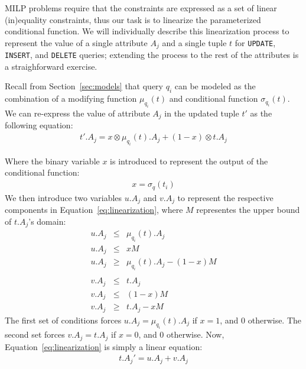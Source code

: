
MILP problems require that the constraints are expressed as a set of linear
(in)equality constraints, thus our task is to linearize the parameterized
conditional function.   We will individually describe this linearization process 
to represent the value of a single attribute $A_j$ and a single tuple $t$ for 
\texttt{UPDATE}, \texttt{INSERT}, and \texttt{DELETE} queries; 
extending the process to the rest of the attributes is a straighforward exercise.



Recall from Section~\ref{sec:models} that query $q_i$ can be modeled as
the combination of a modifying function $\mu_q_i(t)$ and conditional function $\sigma_q_i(t)$.
We can re-express the value of attribute $A_j$ in the updated tuple $t'$ as the following equation:
{\scriptsize
\begin{eqnarray}
\label{eq:linearization}
t'.A_j = x\otimes \mu_q_i(t).A_j + (1-x)\otimes t.A_j 
\end{eqnarray} 
}


\noindent Where the binary variable $x$ is introduced to represent the output of 
the conditional function:
{\scriptsize
\begin{eqnarray}
\label{eq:x}
x = \sigma_q(t_i)
\end{eqnarray}
}
We then introduce two variables $u.A_j$ and $v.A_j$ to represent 
the respective components in Equation~\ref{eq:linearization}, where
$M$ representes the upper bound of $t.A_j$'s domain:
{\scriptsize 
\begin{eqnarray}
\label{eq:uv}
u.A_j &\leq & \mu_q_i(t).A_j \nonumber\\
u.A_j &\leq & xM \nonumber\\ 
u.A_j &\geq & \mu_q_i(t).A_j - (1-x)M \nonumber \\\nonumber \\
v.A_j &\leq & t.A_j \nonumber\\
v.A_j &\leq & (1-x)M \nonumber\\
v.A_j &\geq & t.A_j - xM
\end{eqnarray}
}
The first set of conditions forces $u.A_j = \mu_q_i(t).A_j$ if $x=1$, and $0$ otherwise.  
The second set forces $v.A_j = t.A_j$ if $x=0$, and $0$ otherwise.  
Now, Equation~\ref{eq:linearization} is simply a linear equation:
{\scriptsize\begin{eqnarray}
\label{eq:tnew}
t.A_j' = u.A_j + v.A_j
\end{eqnarray}}



